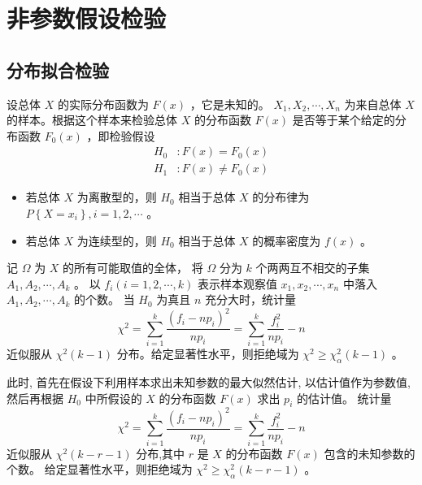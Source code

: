 \section{非参数假设检验}

\subsection{分布拟合检验}

 设总体 $ X $ 的实际分布函数为 $ F(x) $ ，它是未知的。
$ X_1, X_2, \cdots, X_n $ 为来自总体 $ X $ 的样本。根据这个样本来检验总体 $ X $ 的分布函数 $ F(x) $
是否等于某个给定的分布函数 $ F_0(x) $ ，即检验假设
\begin{align*}
    H_0 &: F(x) = F_0(x) \\
    H_1 &: F(x) \neq F_0(x)
\end{align*}
\begin{itemize}[leftmargin=\paritemindent]
    \item 若总体 $ X $ 为离散型的，则 $ H_0 $ 相当于总体 $ X $ 的分布律为
    $ P\left\{ X = x_i \right\} , i = 1, 2, \cdots $ 。
    \item 若总体 $ X $ 为连续型的，则 $ H_0 $ 相当于总体 $ X $ 的概率密度为 $ f(x) $ 。
\end{itemize}

 记 $ \Omega $ 为 $ X $ 的所有可能取值的全体，
将 $ \Omega $ 分为 $ k $ 个两两互不相交的子集 $ A_1, A_2, \cdots, A_k $ 。
以 $ f_i(i = 1, 2, \cdots, k) $ 表示样本观察值 $ x_1, x_2, \cdots, x_n $ 中落入 $ A_1, A_2, \cdots, A_k $ 的个数。
当 $ H_0 $ 为真且 $ n $ 充分大时，统计量
\begin{equation}
    \chi^2 = \sum_{i=1}^{k} \frac{(f_i - np_i)^2}{np_{i}} = \sum_{i=1}^{k} \frac{f_i^2}{np_i} - n
\end{equation}
近似服从 $ \chi^2(k-1) $ 分布。给定显著性水平，则拒绝域为 $ \chi^2 \geqslant \chi_{\alpha}^{2}(k-1) $ 。

 此时, 首先在假设下利用样本求出未知参数的最大似然估计, 以估计值作为参数值, 
然后再根据 $ H_0 $ 中所假设的 $ X $ 的分布函数 $ F(x) $ 求出 $ p_i $ 的估计值。
统计量
\begin{equation*}
    \chi^2 = \sum_{i=1}^{k} \frac{(f_i - np_i)^2}{np_{i}} = \sum_{i=1}^{k} \frac{f_i^2}{np_i} - n
\end{equation*}
近似服从 $ \chi^2(k- r -1) $ 分布,其中 $ r $ 是 $ X $ 的分布函数 $ F(x) $ 包含的未知参数的个数。
给定显著性水平，则拒绝域为 $ \chi^2 \geqslant \chi_{\alpha}^{2}(k-r-1) $ 。


